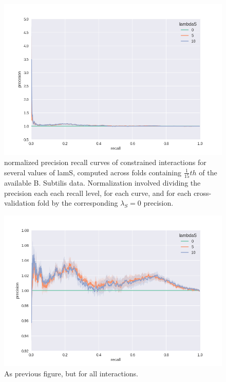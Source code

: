 \documentclass[11pt]{article}
\begin{document}
\begin{figure}
\begin{center}
  \includegraphics[scale=0.45]{woko7.png}
  \caption{\label{fig:figure1} normalized precision recall curves of constrained interactions for several values of lamS, computed across folds containing $\frac{1}{15}th$ of the available B. Subtilis data. Normalization involved dividing the precision each each recall level, for each curve, and for each cross-validation fold by the corresponding $\lambda_S=0$ precision.}
  \end{center}
\end{figure}

\begin{figure}
\begin{center}
  \includegraphics[scale=0.45]{wat7.png}
  \caption{\label{fig:figure1} As previous figure, but for all interactions.}
  \end{center}
\end{figure}




\end{document}
